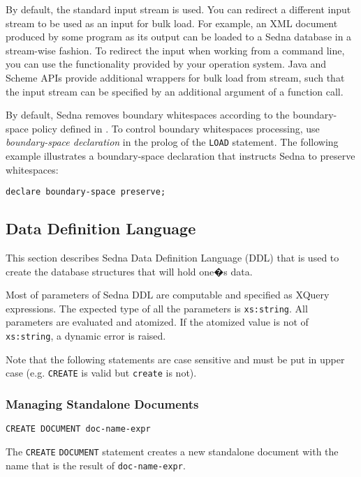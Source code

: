 \documentclass[a4paper,12pt]{article}
\begin{document}
By default, the standard input stream is used. You can redirect a different input stream to be used as an input for bulk load. For example, an XML document produced by some program as its output can be loaded to a Sedna database in a stream-wise fashion. To redirect the input when working from a command line, you can use the functionality provided by your operation system.
Java and Scheme APIs provide additional wrappers for bulk load from stream, such that the input stream can be specified by an additional argument of a function call.

By default, Sedna removes boundary whitespaces according to the boundary-space policy defined in \cite{paper:query-language}. To control boundary whitespaces processing, use \emph{boundary-space declaration} \cite{paper:query-language} in the prolog of the \verb!LOAD! statement.  The following example illustrates a boundary-space declaration that instructs Sedna to preserve whitespaces:
\begin{verbatim}
declare boundary-space preserve;
\end{verbatim}



\subsection{Data Definition Language}

This section describes Sedna Data Definition Language (DDL) that is used to create the database structures that will hold one�s data.

Most of parameters of Sedna DDL are computable and specified as XQuery expressions.
The expected type of all the parameters is \verb!xs:string!. All parameters are evaluated and atomized.
If the atomized value is not of \verb!xs:string!, a dynamic error is raised.

Note that the following statements are case sensitive and must be put in upper case (e.g. \verb!CREATE! is valid but \verb!create! is not).

\subsubsection{Managing Standalone Documents}
\begin{verbatim}
CREATE DOCUMENT doc-name-expr
\end{verbatim}

The \verb!CREATE! \verb!DOCUMENT! statement creates a new standalone document
with the name that is the result of \verb!doc-name-expr!.
\end{document}
